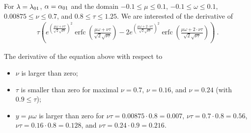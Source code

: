 \documentclass{article}
\renewcommand{\leq}{\leqslant}
\DeclareMathOperator{\erfc}{erfc}
\begin{document}
\begin{lemma}
\label{proof:monotonederivative}
For $\lambda=\lambda_{\rm 01}$, $\alpha=\alpha_{\rm 01}$
and the domain 
$-0.1 \leq \mu \leq 0.1$, 
$-0.1 \leq \omega \leq 0.1$,
$0.00875 \leq \nu \leq 0.7$, and 
$0.8 \leq \tau \leq 1.25$.
We are interested of the derivative of
\begin{align} 
\tau \left(e^{\left(\frac{\mu \omega+\nu \tau}{\sqrt{2} \sqrt{\nu \tau}}\right)^2} \erfc \left(\frac{\mu \omega+\nu \tau}{\sqrt{2} \sqrt{\nu \tau}}\right)-2 e^{\left(\frac{\mu \omega+2 \cdot \nu \tau}{\sqrt{2} \sqrt{\nu \tau}}\right)^2} \erfc \left(\frac{\mu \omega+2 \cdot \nu \tau}{\sqrt{2} \sqrt{\nu \tau}}\right)\right)\ . 
\end{align}

The derivative of the equation above with
respect to
\begin{itemize}
\item $\nu$ is larger than zero;
\item $\tau$ is smaller than zero for maximal
$\nu=0.7$, $\nu=0.16$, and $\nu=0.24$ (with
$0.9 \leq \tau$);
\item $y=\mu \omega$ is larger than zero for $\nu
\tau=0.00875 \cdot 0.8=0.007$, $\nu
\tau=0.7 \cdot 0.8=0.56$, $\nu
\tau=0.16 \cdot 0.8=0.128$, and $\nu
\tau=0.24 \cdot 0.9=0.216$.
\end{itemize}

\end{lemma}
\end{document}
